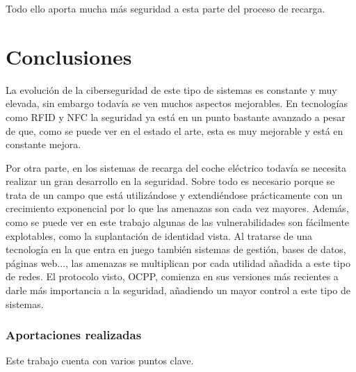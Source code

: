 \documentclass[12pt,a4paper,onecolumn,oneside]{report}
\newcommand{\mychapter}[2]{
	\setcounter{chapter}{#1}
	\setcounter{section}{1}
	\chapter*{#2}
	\addcontentsline{toc}{chapter}{#2}
}
\begin{document}
Todo ello aporta mucha más seguridad a esta parte del proceso de recarga.

\mychapter{1}{Conclusiones}

La evolución de la ciberseguridad de este tipo de sistemas es constante y muy elevada, sin embargo todavía se ven muchos aspectos mejorables.
En tecnologías como RFID y NFC la seguridad ya está en un punto bastante avanzado a pesar de que, como se puede ver en el estado el arte, esta es muy mejorable y está en constante mejora.

Por otra parte, en los sistemas de recarga del coche eléctrico todavía se necesita realizar un gran desarrollo en la seguridad. Sobre todo es necesario porque se trata de un campo que está utilizándose y extendiéndose prácticamente con un crecimiento exponencial por lo que las amenazas son cada vez mayores. Además, como se puede ver en este trabajo algunas de las vulnerabilidades son fácilmente explotables, como la suplantación de identidad vista. Al tratarse de una tecnología en la que entra en juego también sistemas de gestión, bases de datos, páginas web..., las amenazas se multiplican por cada utilidad añadida a este tipo de redes. El protocolo visto, OCPP, comienza en sus versiones más recientes a darle más importancia a la seguridad, añadiendo un mayor control a este tipo de sistemas.


\subsection*{Aportaciones realizadas}

Este trabajo cuenta con varios puntos clave. 
\end{document}
